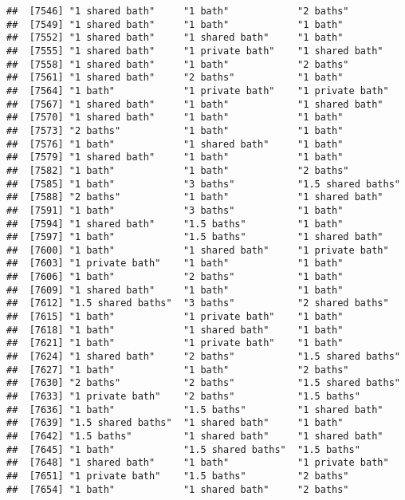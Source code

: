 \documentclass[
]{article}
\begin{document}
\begin{verbatim}
##  [7546] "1 shared bath"     "1 bath"            "2 baths"          
##  [7549] "1 shared bath"     "1 bath"            "1 bath"           
##  [7552] "1 shared bath"     "1 shared bath"     "1 bath"           
##  [7555] "1 shared bath"     "1 private bath"    "1 shared bath"    
##  [7558] "1 shared bath"     "1 bath"            "2 baths"          
##  [7561] "1 shared bath"     "2 baths"           "1 bath"           
##  [7564] "1 bath"            "1 private bath"    "1 private bath"   
##  [7567] "1 shared bath"     "1 bath"            "1 shared bath"    
##  [7570] "1 shared bath"     "1 bath"            "1 bath"           
##  [7573] "2 baths"           "1 bath"            "1 bath"           
##  [7576] "1 bath"            "1 shared bath"     "1 bath"           
##  [7579] "1 shared bath"     "1 bath"            "1 bath"           
##  [7582] "1 bath"            "1 bath"            "2 baths"          
##  [7585] "1 bath"            "3 baths"           "1.5 shared baths" 
##  [7588] "2 baths"           "1 bath"            "1 shared bath"    
##  [7591] "1 bath"            "3 baths"           "1 bath"           
##  [7594] "1 shared bath"     "1.5 baths"         "1 bath"           
##  [7597] "1 bath"            "1.5 baths"         "1 shared bath"    
##  [7600] "1 bath"            "1 shared bath"     "1 private bath"   
##  [7603] "1 private bath"    "1 bath"            "1 bath"           
##  [7606] "1 bath"            "2 baths"           "1 bath"           
##  [7609] "1 shared bath"     "1 bath"            "1 bath"           
##  [7612] "1.5 shared baths"  "3 baths"           "2 shared baths"   
##  [7615] "1 bath"            "1 private bath"    "1 bath"           
##  [7618] "1 bath"            "1 shared bath"     "1 bath"           
##  [7621] "1 bath"            "1 private bath"    "1 bath"           
##  [7624] "1 shared bath"     "2 baths"           "1.5 shared baths" 
##  [7627] "1 bath"            "1 bath"            "2 baths"          
##  [7630] "2 baths"           "2 baths"           "1.5 shared baths" 
##  [7633] "1 private bath"    "2 baths"           "1.5 baths"        
##  [7636] "1 bath"            "1.5 baths"         "1 shared bath"    
##  [7639] "1.5 shared baths"  "1 shared bath"     "1 bath"           
##  [7642] "1.5 baths"         "1 shared bath"     "1 shared bath"    
##  [7645] "1 bath"            "1.5 shared baths"  "1.5 baths"        
##  [7648] "1 shared bath"     "1 bath"            "1 private bath"   
##  [7651] "1 private bath"    "1.5 baths"         "2 baths"          
##  [7654] "1 bath"            "1 shared bath"     "2 baths"          

\end{verbatim}
\end{document}
